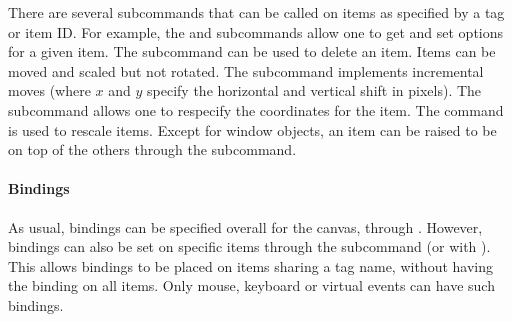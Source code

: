 There are several subcommands that can be called on items as specified
by a tag or item ID. For example, the 
and  subcommands allow one to get
and set options for a given item. The
 subcommand can be used to
delete an item. Items can be moved and scaled but not rotated. The
 subcommand implements
incremental moves (where $x$ and $y$ specify the horizontal and
vertical shift in pixels). The subcommand
 allows one
to respecify the coordinates for the item. The
 command is used to rescale items. Except
for window objects, an item can be raised to be on top of the others
through the  subcommand.



\paragraph{Bindings}
As usual, bindings can be specified overall for the canvas, through
. However, bindings can also be set on specific items
through the subcommand  (or with ). This allows bindings to be
placed on items sharing a tag name, without having the binding on all
items. Only mouse, keyboard or virtual events can have such bindings.

